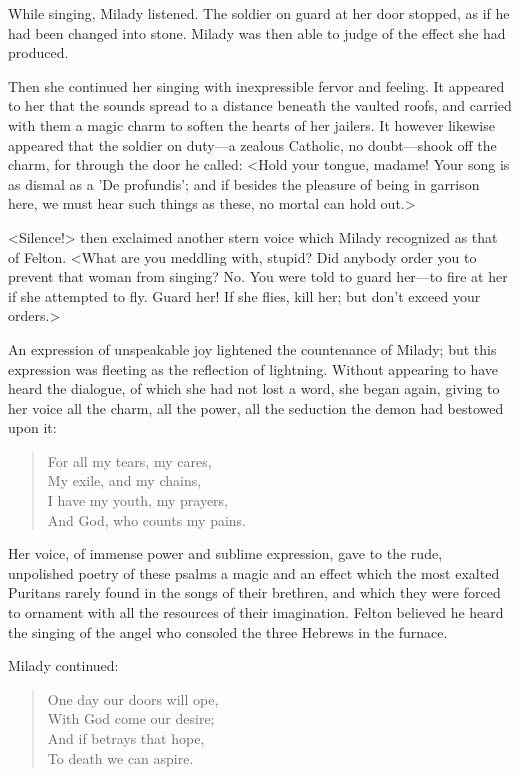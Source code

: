 While singing, Milady listened. The soldier on guard at her door stopped, as if he had been changed into stone. Milady was then able to judge of the effect she had produced. 

Then she continued her singing with inexpressible fervor and feeling. It appeared to her that the sounds spread to a distance beneath the vaulted roofs, and carried with them a magic charm to soften the hearts of her jailers. It however likewise appeared that the soldier on duty---a zealous Catholic, no doubt---shook off the charm, for through the door he called: <Hold your tongue, madame! Your song is as dismal as a 'De profundis'; and if besides the pleasure of being in garrison here, we must hear such things as these, no mortal can hold out.> 

<Silence!> then exclaimed another stern voice which Milady recognized as that of Felton. <What are you meddling with, stupid? Did anybody order you to prevent that woman from singing? No. You were told to guard her---to fire at her if she attempted to fly. Guard her! If she flies, kill her; but don't exceed your orders.> 

An expression of unspeakable joy lightened the countenance of Milady; but this expression was fleeting as the reflection of lightning. Without appearing to have heard the dialogue, of which she had not lost a word, she began again, giving to her voice all the charm, all the power, all the seduction the demon had bestowed upon it: 

\begin{verse}
	For all my tears, my cares,\\
	My exile, and my chains,\\
	I have my youth, my prayers,\\
	And God, who counts my pains.
\end{verse}

Her voice, of immense power and sublime expression, gave to the rude, unpolished poetry of these psalms a magic and an effect which the most exalted Puritans rarely found in the songs of their brethren, and which they were forced to ornament with all the resources of their imagination. Felton believed he heard the singing of the angel who consoled the three Hebrews in the furnace. 

Milady continued: 

\begin{verse}
One day our doors will ope,\\
With God come our desire;\\
And if betrays that hope,\\
To death we can aspire.
	\end{verse}


